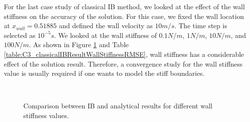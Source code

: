 For the last case study of classical IB method, we looked at the effect of the wall stiffness on the accuracy of the solution. For this case, we fixed the wall location at $x_{wall} = 0.51885$ and defined the wall velocity as $10 m/s$. The time step is selected as $10^{-5} s$. We looked at the wall stiffness of $0.1 N/m$, $1 N/m$, $10 N/m$, and $100 N/m$. As shown in Figure \ref{fig:C3_classicalIBResultWallStiffness} and Table \ref{table:C3_classicalIBResultWallStiffnessRMSE}, wall stiffness has a considerable effect of the solution result. Therefore, a convergence study for the wall stiffness value is usually required if one wants to model the stiff boundaries.

\begin{figure}[H]
    \centering
    \quad
    \\
    \quad
    \caption{Comparison between IB and analytical results for different wall stiffness values.}
    \label{fig:C3_classicalIBResultWallStiffness}
\end{figure}

